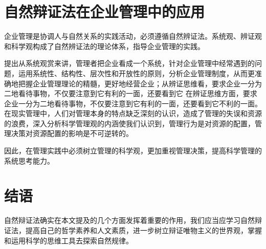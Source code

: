 \documentclass[UTF8,a4paper]{ctexart}
\begin{document}
\section{自然辩证法在企业管理中的应用}
企业管理是协调人与自然关系的实践活动，必须遵循自然辨证法。系统观、辨证观和科学观构成了自然辨证法的理论体系，指导企业管理的实践。
\par
\cite{RN12}提出从系统观赏来讲，管理者把企业看成一个系统，针对企业管理中经常遇到的问题，运用系统性、结构性、层次性和开放性的原则，分析企业管理制度，从而更准确地把握企业管理理论的精髓，更好地经营企业；从辨证思维看，要求企业一分为二地看待事物，不仅要注意到它有利的一面，还要看到它 在辨证思维方面，要求企业一分为二地看待事物，不仅要注意到它有利的一面，还要看到它不利的一面。在现实管理中，人们对管理本身的特点缺乏深刻的认识，造成了管理的失误和资源的浪费，深入分析科学管理观的内涵使我们认识到，管理行为是对资源的配置，管理决策对资源配置的影响是不可逆转的。
\par
因此，在管理实践中必须树立管理的科学观，更加重视管理决策，提高科学管理的系统思考能力。
\section{结语}
自然辩证法确实在本文提及的几个方面发挥着重要的作用，我们应当应学习自然辩证法，提高自己的哲学素养和人文素质，进一步树立辩证唯物主义的世界观，掌握和运用科学的思维工具去探索自然规律。
\renewcommand{\refname}{参考文献}


\clearpage
\end{document}
